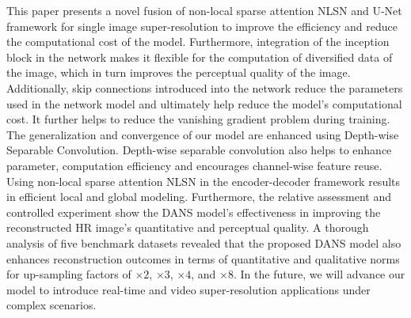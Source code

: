 \documentclass{ieeeaccess}
\begin{document}
This paper presents a novel fusion of non-local sparse attention NLSN and U-Net framework for single image super-resolution to improve the efficiency and reduce the computational cost of the model. Furthermore, integration of the inception block in the network makes it flexible for the computation of diversified data of the image, which in turn improves the perceptual quality of the image. Additionally, skip connections introduced into the network reduce the parameters used in the network model and ultimately help reduce the model's computational cost. It further helps to reduce the vanishing gradient problem during training. The generalization and convergence of our model are enhanced using Depth-wise Separable Convolution. Depth-wise separable convolution also helps to enhance parameter, computation efficiency and encourages channel-wise feature reuse. Using non-local sparse attention NLSN in the encoder-decoder framework results in efficient local and global modeling. Furthermore, the relative assessment and controlled experiment show the DANS model's effectiveness in improving the reconstructed HR image's quantitative and perceptual quality. A thorough analysis of five benchmark datasets revealed that the proposed DANS model also enhances reconstruction outcomes in terms of quantitative and qualitative norms for up-sampling factors of $\times 2$, $\times 3$, $\times 4$, and $\times 8$. In the future, we will advance our model to introduce real-time and video super-resolution applications under complex scenarios.
\end{document}
